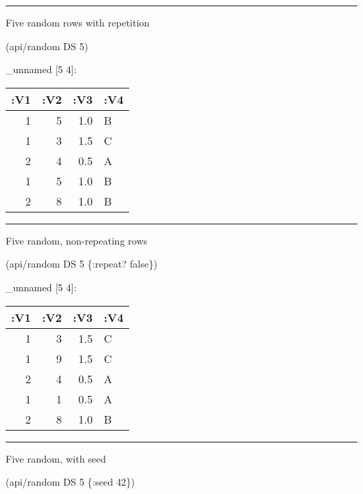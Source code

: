 \documentclass[]{article}
\newenvironment{Shaded}{\begin{snugshade}}{\end{snugshade}}
\newcommand{\DecValTok}[1]{\textcolor[rgb]{0.00,0.00,0.81}{#1}}
\newcommand{\VariableTok}[1]{\textcolor[rgb]{0.00,0.00,0.00}{#1}}
\newcommand{\AttributeTok}[1]{\textcolor[rgb]{0.77,0.63,0.00}{#1}}
\newcommand{\NormalTok}[1]{#1}
\begin{document}
\begin{center}\rule{0.5\linewidth}{0.5pt}\end{center}

Five random rows with repetition

\begin{Shaded}
\begin{Highlighting}[]
\NormalTok{(api/random DS }\DecValTok{5}\NormalTok{)}
\end{Highlighting}
\end{Shaded}

\_unnamed {[}5 4{]}:

\begin{longtable}[]{@{}rrrl@{}}
\toprule
:V1 & :V2 & :V3 & :V4\tabularnewline
\midrule
\endhead
1 & 5 & 1.0 & B\tabularnewline
1 & 3 & 1.5 & C\tabularnewline
2 & 4 & 0.5 & A\tabularnewline
1 & 5 & 1.0 & B\tabularnewline
2 & 8 & 1.0 & B\tabularnewline
\bottomrule
\end{longtable}

\begin{center}\rule{0.5\linewidth}{0.5pt}\end{center}

Five random, non-repeating rows

\begin{Shaded}
\begin{Highlighting}[]
\NormalTok{(api/random DS }\DecValTok{5}\NormalTok{ \{}\AttributeTok{:repeat}\NormalTok{? }\VariableTok{false}\NormalTok{\})}
\end{Highlighting}
\end{Shaded}

\_unnamed {[}5 4{]}:

\begin{longtable}[]{@{}rrrl@{}}
\toprule
:V1 & :V2 & :V3 & :V4\tabularnewline
\midrule
\endhead
1 & 3 & 1.5 & C\tabularnewline
1 & 9 & 1.5 & C\tabularnewline
2 & 4 & 0.5 & A\tabularnewline
1 & 1 & 0.5 & A\tabularnewline
2 & 8 & 1.0 & B\tabularnewline
\bottomrule
\end{longtable}

\begin{center}\rule{0.5\linewidth}{0.5pt}\end{center}

Five random, with seed

\begin{Shaded}
\begin{Highlighting}[]
\NormalTok{(api/random DS }\DecValTok{5}\NormalTok{ \{}\AttributeTok{:seed} \DecValTok{42}\NormalTok{\})}
\end{Highlighting}
\end{Shaded}
\end{document}

